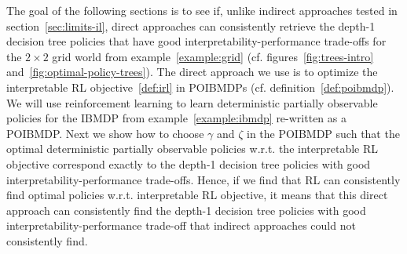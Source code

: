 The goal of the following sections is to see if, unlike indirect approaches tested in section~\ref{sec:limits-il}, direct approaches can consistently retrieve the depth-1 decision tree policies that have good interpretability-performance trade-offs for the $2\times 2$ grid world from example~\ref{example:grid} (cf. figures~\ref{fig:trees-intro} and~\ref{fig:optimal-policy-trees}).
The direct approach we use is to optimize the interpretable RL objective~\ref{def:irl} in POIBMDPs (cf. definition~\ref{def:poibmdp}).
We will use reinforcement learning to learn deterministic partially observable policies for the IBMDP from example~\ref{example:ibmdp} re-written as a POIBMDP.
Next we show how to choose $\gamma$ and $\zeta$ in the POIBMDP such that the optimal deterministic partially observable policies w.r.t. the interpretable RL objective correspond exactly to the depth-1 decision tree policies with good interpretability-performance trade-offs.
Hence, if we find that RL can consistently find optimal policies w.r.t. interpretable RL objective, it means that this direct approach can consistently find the depth-1 decision tree policies with good interpretability-performance trade-off that indirect approaches could not consistently find.

